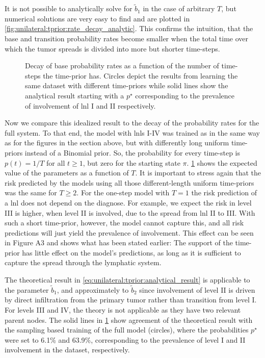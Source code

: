 \documentclass[\relativeRoot/main.tex]{subfiles}
\begin{document}
It is not possible to analytically solve for $\tilde{b}_1$ in the case of arbitrary $T$, but numerical solutions are very easy to find and are plotted in \cref{fig:unilateral:tprior:rate_decay_analytic}. This confirms the intuition, that the base and transition probability rates become smaller when the total time over which the tumor spreads is divided into more but shorter time-steps.

\begin{figure}
    \centering
    \def\svgwidth{1.0\textwidth}
    
    \caption{Decay of base probability rates as a function of the number of time-steps the time-prior has. Circles depict the results from learning the same dataset with different time-priors while solid lines show the analytical result starting with a $p^{\star}$ corresponding to the prevalence of involvement of \gls{lnl} I and II respectively.}
    \label{fig:unilateral:tprior:rate_decay_sampled}
\end{figure}

Now we compare this idealized result to the decay of the probability rates for the full system. To that end, the model with \glspl{lnl} I-IV was trained as in the same way as for the figures in the section above, but with differently long uniform time-priors instead of a Binomial prior. So, the probability for every time-step is $p(t)=1/T$ for all $t \geq 1$, but zero for the starting state $\pi$. \cref{fig:unilateral:tprior:rate_decay_sampled} shows the expected value of the parameters as a function of $T$. It is important to stress again that the risk predicted by the models using all those different-length uniform time-priors was the same for $T \geq 2$. For the one-step model with $T=1$ the risk prediction of a \gls{lnl} does not depend on the diagnose. For example, we expect the risk in level III is higher, when level II is involved, due to the spread from \gls{lnl} II to III. With such a short time-prior, however, the model cannot capture this, and all risk predictions will just yield the prevalence of involvement. This effect can be seen in Figure A3 and shows what has been stated earlier: The support of the time-prior has little effect on the model's predictions, as long as it is sufficient to capture the spread through the lymphatic system.

The theoretical result in \cref{eq:unilateral:tprior:analytical_result} is applicable to the parameter $\tilde{b}_1$, and approximately to $\tilde{b}_2$ since involvement of level II is driven by direct infiltration from the primary tumor rather than transition from level I. For levels III and IV, the theory is not applicable as they have two relevant parent nodes. The solid lines in \cref{fig:unilateral:tprior:rate_decay_sampled} show agreement of the theoretical result with the sampling based training of the full model (circles), where the probabilities $p^{\star}$ were set to 6.1\% and 63.9\%, corresponding to the prevalence of level I and II involvement in the dataset, respectively.
\end{document}
